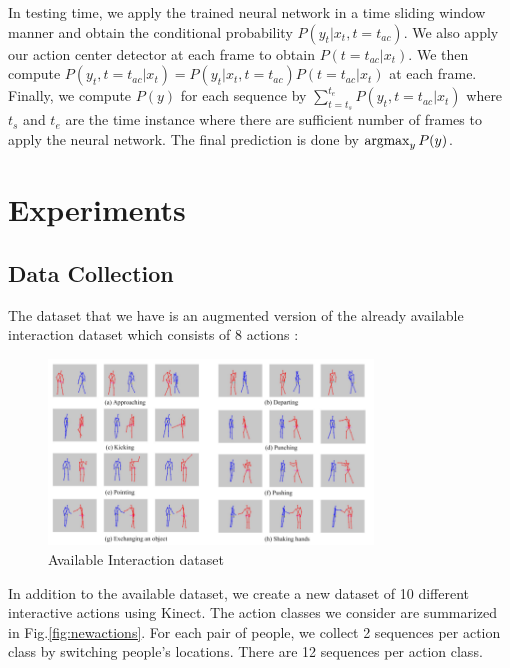 \documentclass[10pt,twocolumn,letterpaper]{article}
\newcommand{\argmax}{\operatornamewithlimits{argmax}}
\begin{document}
In testing time, we apply the trained neural network in a time sliding window manner and obtain the conditional probability $P(y_t|x_t,t=t_{ac})$. We also apply our action center detector at each frame to obtain $P(t=t_{ac}|x_t)$. We then compute $P(y_t,t=t_{ac}|x_t)=P(y_t|x_t,t=t_{ac}) P(t=t_{ac}|x_t)$ at each frame. Finally, we compute $P(y)$ for each sequence by $\sum_{t=t_{s}}^{t_{e}} P(y_t,t=t_{ac}|x_t)$ where $t_{s}$ and $t_{e}$ are the time instance where there are sufficient number of frames to apply the neural network. The final prediction is done by $\argmax_{y} P(y)$.

\section{Experiments}

\subsection{Data Collection}

The dataset that we have is an augmented version of the already available interaction dataset which consists of 8 actions :


\begin{figure}[htb]
\begin{center}
\includegraphics[width=3.4in]{dataset.png}
\caption{Available Interaction dataset \label{fig:Fig:2}}
\end{center}
\end{figure}


In addition to the available dataset, we create a new dataset of 10 different interactive actions using Kinect. The action classes we consider are summarized in Fig.\ref{fig:newactions}. For each pair of people, we collect 2 sequences per action class by switching people's locations. There are 12 sequences per action class.
\end{document}
